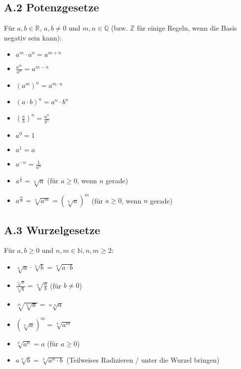 \begin{multicols}{2} %

\subsection*{A.2 Potenzgesetze}
Für $a, b \in \mathbb{R}$, $a,b \neq 0$ und $m, n \in \mathbb{Q}$ (bzw. $\mathbb{Z}$ für einige Regeln, wenn die Basis negativ sein kann):
\begin{itemize}
    \item $a^m \cdot a^n = a^{m+n}$
    \item $\frac{a^m}{a^n} = a^{m-n}$
    \item $(a^m)^n = a^{m \cdot n}$
    \item $(a \cdot b)^n = a^n \cdot b^n$
    \item $\left(\frac{a}{b}\right)^n = \frac{a^n}{b^n}$
    \item $a^0 = 1$
    \item $a^1 = a$
    \item $a^{-n} = \frac{1}{a^n}$
    \item $a^{\frac{1}{n}} = \sqrt[n]{a}$ \quad (für $a \ge 0$, wenn $n$ gerade)
    \item $a^{\frac{m}{n}} = \sqrt[n]{a^m} = (\sqrt[n]{a})^m$ \quad (für $a \ge 0$, wenn $n$ gerade)
\end{itemize}

\subsection*{A.3 Wurzelgesetze}
Für $a, b \ge 0$ und $n, m \in \mathbb{N}, n,m \ge 2$:
\begin{itemize}
    \item $\sqrt[n]{a} \cdot \sqrt[n]{b} = \sqrt[n]{a \cdot b}$
    \item $\frac{\sqrt[n]{a}}{\sqrt[n]{b}} = \sqrt[n]{\frac{a}{b}}$ \quad (für $b \neq 0$)
    \item $\sqrt[m]{\sqrt[n]{a}} = \sqrt[m \cdot n]{a}$
    \item $(\sqrt[n]{a})^m = \sqrt[n]{a^m}$
    \item $\sqrt[n]{a^n} = a$ (für $a \ge 0$)
    \item $a \sqrt[n]{b} = \sqrt[n]{a^n \cdot b}$ (Teilweises Radizieren / unter die Wurzel bringen)
\end{itemize}


\end{multicols}
